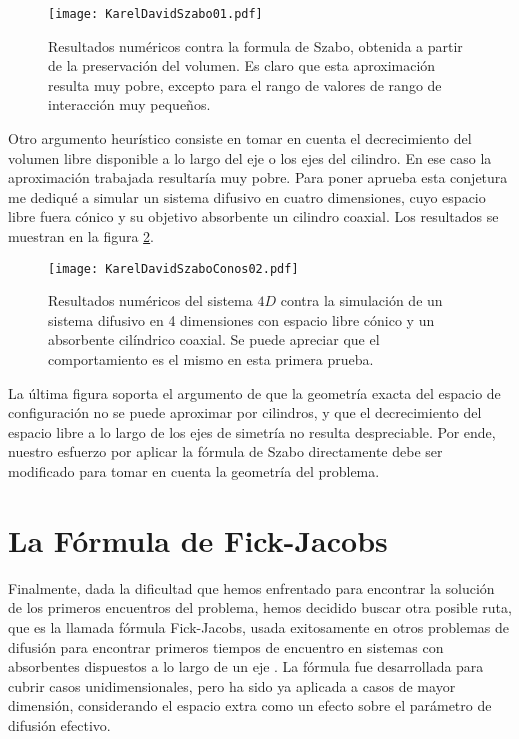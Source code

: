 \documentclass[letterpaperr,12pt]{article}
\begin{document}
\begin{figure}[h]
  \centering
   \texttt{[image: KarelDavidSzabo01.pdf]}
   \caption{Resultados numéricos contra la formula de Szabo, obtenida
a partir de la preservación del volumen. Es claro que esta
aproximación resulta muy pobre, excepto para el rango de valores
de rango de interacción muy pequeños. }\label{Resultados01}
\end{figure}

Otro argumento heurístico consiste en tomar en cuenta el decrecimiento 
del volumen libre disponible a lo largo del eje o los ejes del
cilindro. En ese caso la aproximación trabajada resultaría muy pobre.
Para poner aprueba esta conjetura me dediqué a simular un sistema
difusivo en cuatro dimensiones, cuyo espacio libre fuera cónico y 
su objetivo absorbente un cilindro coaxial. Los resultados se
muestran en la figura \ref{Conos01}.

\begin{figure}[h]
  \centering
   \texttt{[image: KarelDavidSzaboConos02.pdf]}
   \caption{Resultados numéricos del sistema $4D$ contra la 
simulación de un sistema difusivo en 4 dimensiones con espacio
libre cónico y un absorbente cilíndrico coaxial. Se puede
apreciar que el comportamiento es el mismo en esta primera prueba.
 }\label{Conos01}
\end{figure}

La última figura soporta el argumento de que la geometría
exacta del espacio de configuración no se puede aproximar por cilindros,
y que el decrecimiento del espacio libre a lo largo de los ejes
de simetría no resulta despreciable. Por ende, nuestro esfuerzo
por aplicar la fórmula de Szabo directamente debe ser modificado para
tomar en cuenta la geometría del problema.

\section{La Fórmula de Fick-Jacobs}

Finalmente, dada la dificultad que hemos enfrentado para encontrar la
solución de los primeros encuentros del problema, hemos decidido buscar
otra posible ruta, que es la llamada fórmula Fick-Jacobs, usada
exitosamente en otros problemas de difusión para encontrar primeros
tiempos de encuentro en sistemas con absorbentes dispuestos a lo largo
de un eje \cite{Jacobs}. La fórmula fue desarrollada para cubrir casos
unidimensionales, pero ha sido ya aplicada a casos de mayor dimensión, 
considerando el espacio extra como un efecto sobre el parámetro
de difusión efectivo. \cite{Dagdug}
\end{document}
